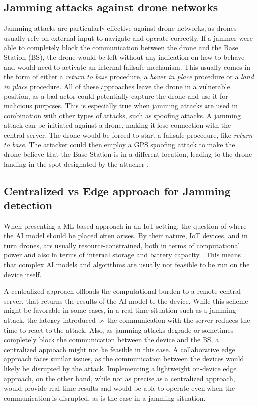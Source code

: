 \documentclass[futureinternet,article,submit,pdftex,moreauthors]{Definitions/mdpi}
\begin{document}
\subsection{Jamming attacks against drone networks}\label{JammingDroneNetworks}

Jamming attacks are particularly effective against drone networks, as drones usually rely on external input to navigate and operate correctly.
If a jammer were able to completely block the communication between the drone and the Base Station (BS), the drone would be left without any indication on how to behave and would need to activate an internal failsafe mechanism. 
This usually comes in the form of either a \textit{return to base} procedure, a \textit{hover in place} procedure or a \textit{land in place} procedure.
All of these approaches leave the drone in a vulnerable position, as a bad actor could potentially capture the drone and use it for malicious purposes.
This is especially true when jamming attacks are used in combination with other types of attacks, such as spoofing attacks. A jamming attack can be initiated against a drone, making it lose connection with the central server. 
The drone would be forced to start a failsafe procedure, like \textit{return to base}. The attacker could then employ a GPS spoofing attack to make the drone believe that the Base Station is in a different location, leading to the drone landing in the spot designated by the attacker \cite{RQ170DroneOwano}.

\subsection{Centralized vs Edge approach for Jamming detection}

When presenting a ML based approach in an IoT setting, the question of where the AI model should be placed often arises. By their nature, IoT devices, and in turn drones, are usually resource-constrained, 
both in terms of computational power and also in terms of internal storage and battery capacity \cite{6GSecurity-Chorti}. This means that complex AI models and algorithms are usually not feasible to be run on the device itself. 

A centralized approach offloads the computational burden to a remote central server, that returns the results of the AI model to the device. While this scheme might be favorable in some cases, in a real-time situation such as a jamming attack, the latency introduced by the
communication with the server reduces the time to react to the attack. Also, as jamming attacks degrade or sometimes completely block the communication between the device and the BS, a centralized approach might not be feasible in this case.
A collaborative edge approach faces similar issues, as the communication between the devices would likely be disrupted by the attack. 
Implementing a lightweight on-device edge approach, on the other hand, while not as precise as a centralized approach, would provide real-time results and would be able to operate even when the communication is disrupted, as is the case in a jamming situation. 
\end{document}
